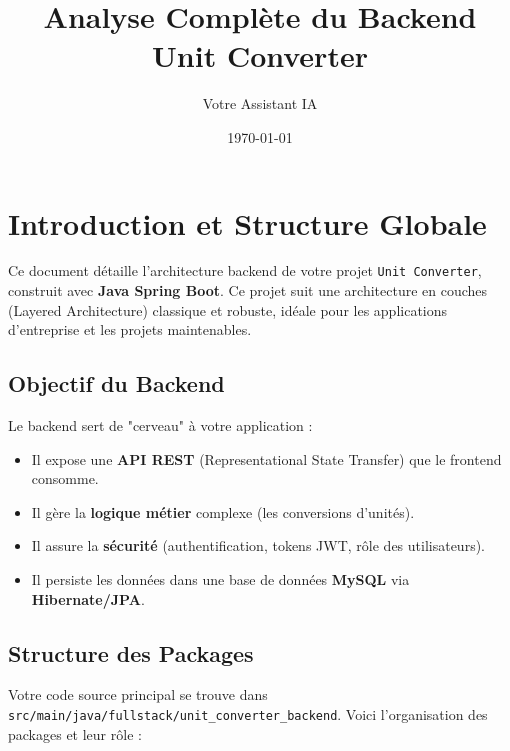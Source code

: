 \documentclass{article}
\title{Analyse Complète du Backend Unit Converter}
\author{Votre Assistant IA}
\date{\today}
\begin{document}
\maketitle

\tableofcontents

\section{Introduction et Structure Globale}

Ce document détaille l'architecture backend de votre projet \texttt{Unit Converter}, construit avec \textbf{Java Spring Boot}. Ce projet suit une architecture en couches (Layered Architecture) classique et robuste, idéale pour les applications d'entreprise et les projets maintenables.

\subsection{Objectif du Backend}

Le backend sert de "cerveau" à votre application :
\begin{itemize}
    \item Il expose une \textbf{API REST} (Representational State Transfer) que le frontend consomme.
    \item Il gère la \textbf{logique métier} complexe (les conversions d'unités).
    \item Il assure la \textbf{sécurité} (authentification, tokens JWT, rôle des utilisateurs).
    \item Il persiste les données dans une base de données \textbf{MySQL} via \textbf{Hibernate/JPA}.
\end{itemize}

\subsection{Structure des Packages}

Votre code source principal se trouve dans \texttt{src/main/java/fullstack/unit\_converter\_backend}. Voici l'organisation des packages et leur rôle :
\end{document}
